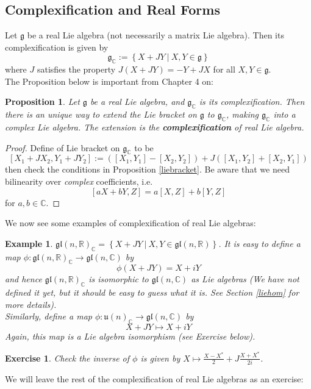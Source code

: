 \documentclass[11pt]{article}
\newtheorem{proposition}[theorem]{Proposition}
\newtheorem{example}[theorem]{Example}
\newtheorem{exercise}[theorem]{Exercise}
\newcommand{\bb}[1]{\mathbb{#1}}
\newcommand{\mf}[1]{\mathfrak{#1}}
\begin{document}
\subsection{Complexification and Real Forms}
Let $\mf{g}$ be a real Lie algebra (not necessarily a matrix Lie algebra). Then its complexification is given by
$$\mf{g}_{\bb{C}} := \left\{X + JY\ \Big|\ X, Y \in \mf{g} \right\}$$
where $J$ satisfies the property $J(X+JY) = -Y + JX$ for all $X, Y \in \mf{g}$.\\
The Proposition below is important from Chapter 4 on:
\begin{proposition}
Let $\mf{g}$ be a real Lie algebra, and $\mf{g}_{\bb{C}}$ is its complexification. Then there is an unique way to extend the Lie bracket on $\mf{g}$ to $\mf{g}_{\bb{C}}$, making $\mf{g}_{\bb{C}}$ into a complex Lie algebra. The extension is the \textbf{complexification} of real Lie algebra.
\end{proposition}
\begin{proof}
Define of Lie bracket on $\mf{g}_{\bb{C}}$ to be
$$[X_1 + JX_2, Y_1 + JY_2] := ([X_1,Y_1]-[X_2,Y_2]) + J([X_1,Y_2] + [X_2, Y_1])$$
then check the conditions in Proposition \ref{liebracket}. Be aware that we need bilinearity over \textit{complex} coefficients, i.e.
$$[aX+bY, Z] = a[X,Z]+b[Y,Z]$$
for $a, b \in \bb{C}$.
\end{proof}
We now see some examples of complexification of real Lie algebras:
\begin{example}
$\mf{gl}(n,\bb{R})_{\bb{C}} = \left\{ X + JY\ \Big|\ X, Y \in \mf{gl}(n,\bb{R}) \right\}$. It is easy to define a map $\phi: \mf{gl}(n,\bb{R})_{\bb{C}} \to \mf{gl}(n,\bb{C})$ by
$$\phi(X + JY) = X  + iY$$
and hence $\mf{gl}(n,\bb{R})_{\bb{C}}$ is isomorphic to $\mf{gl}(n,\bb{C})$ as Lie algebras (We have not defined it yet, but it should be easy to guess what it is. See Section \ref{liehom} for more details).\\
Similarly, define a map $\phi: \mf{u}(n)_{\bb{C}} \to \mf{gl}(n,\bb{C})$ by
$$X+JY \mapsto X+iY$$
Again, this map is a Lie algebra isomorphism (see Exercise below).
\end{example}
\begin{exercise}
Check the inverse of $\phi$ is given by $X \mapsto \frac{X-X^*}{2} + J\frac{X+X^*}{2i}$.
\end{exercise}
We will leave the rest of the complexification of real Lie algebras as an exercise:
\end{document}
